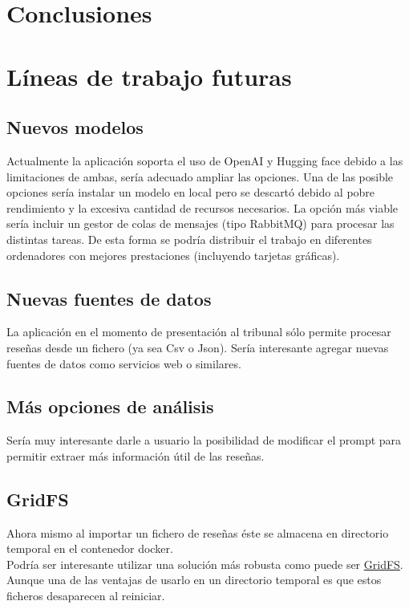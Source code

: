 
\section{Conclusiones}


\section{Líneas de trabajo futuras}

\subsection{Nuevos modelos}
Actualmente la aplicación soporta el uso de OpenAI y Hugging face debido a las limitaciones de ambas,
sería adecuado ampliar las opciones. Una de las posible opciones sería instalar un modelo en local 
pero se descartó debido al pobre rendimiento y la excesiva cantidad de recursos necesarios.
La opción más viable sería incluir un gestor de colas de mensajes (tipo RabbitMQ) para procesar las distintas tareas.
De esta forma se podría distribuir el trabajo en diferentes ordenadores con mejores prestaciones 
(incluyendo tarjetas gráficas).

\subsection{Nuevas fuentes de datos}
La aplicación en el momento de presentación al tribunal sólo permite procesar reseñas desde un fichero (ya sea Csv o Json).
Sería interesante agregar nuevas fuentes de datos como servicios web o similares.

\subsection{Más opciones de análisis}
Sería muy interesante darle a usuario la posibilidad de modificar el prompt para permitir 
extraer más información útil de las reseñas.

\subsection{GridFS}
Ahora mismo al importar un fichero de reseñas éste se almacena en directorio temporal en el contenedor docker.\\
Podría ser interesante utilizar una solución más robusta como puede ser \href{https://www.mongodb.com/docs/manual/core/gridfs/}{GridFS}. 
Aunque una de las ventajas de usarlo en un directorio temporal es que estos ficheros desaparecen al reiniciar.
